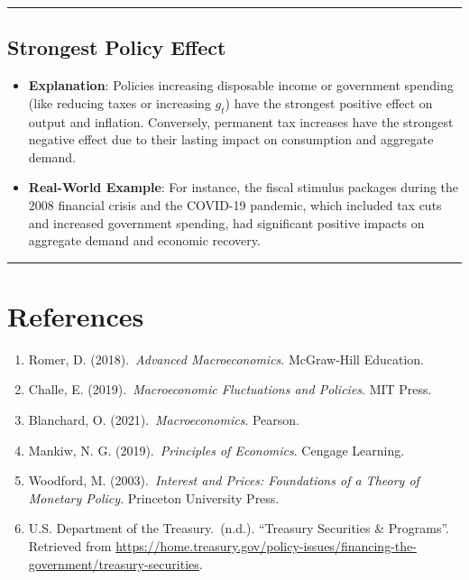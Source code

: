 \documentclass{article}
\begin{document}
\noindent\rule{\linewidth}{0.5pt}

\subsection{Strongest Policy Effect}
\begin{itemize}
    \item \textbf{Explanation}: Policies increasing disposable income or government spending (like reducing taxes or increasing \( g_t \)) have the strongest positive effect on output and inflation. Conversely, permanent tax increases have the strongest negative effect due to their lasting impact on consumption and aggregate demand.
    \item \textbf{Real-World Example}: For instance, the fiscal stimulus packages during the 2008 financial crisis and the COVID-19 pandemic, which included tax cuts and increased government spending, had significant positive impacts on aggregate demand and economic recovery.
\end{itemize}

\FloatBarrier{}
\noindent\rule{\linewidth}{1pt}
\newpage
\section*{References}
\begin{enumerate}
    \item Romer, D. (2018).\ \textit{Advanced Macroeconomics}. McGraw-Hill Education.
    \item Challe, E. (2019).\ \textit{Macroeconomic Fluctuations and Policies}. MIT Press.
    \item Blanchard, O. (2021).\ \textit{Macroeconomics}. Pearson.
    \item Mankiw, N. G. (2019).\ \textit{Principles of Economics}. Cengage Learning.
    \item Woodford, M. (2003).\ \textit{Interest and Prices: Foundations of a Theory of Monetary Policy}. Princeton University Press.
    \item U.S. Department of the Treasury.\ (n.d.). ``Treasury Securities \& Programs''. Retrieved from \url{https://home.treasury.gov/policy-issues/financing-the-government/treasury-securities}.
\end{enumerate}
\end{document}
